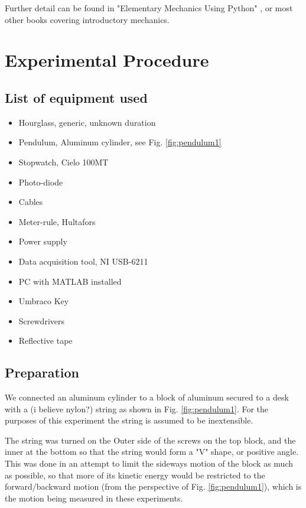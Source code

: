 \documentclass[%
 reprint,
 amsmath,amssymb,
 aps,
]{revtex4-1}
\begin{document}
	Further detail can be found in "Elementary Mechanics Using Python" \cite{elempy}, or most other books covering introductory mechanics.

\section{\label{section:experimentalproced}Experimental Procedure}
    
    \subsection{List of equipment used}
    \begin{itemize}
        \item Hourglass, generic, unknown duration
        \item Pendulum, Aluminum cylinder, see Fig. \ref{fig:pendulum1}
        \item Stopwatch, Cielo 100MT
        \item Photo-diode
        \item Cables
        \item Meter-rule, Hultafors
        \item Power supply
        \item Data acquisition tool, NI USB-6211
        \item PC with MATLAB installed
        \item Umbraco Key
        \item Screwdrivers
        \item Reflective tape
    \end{itemize}

    \subsection{Preparation}
        We connected an aluminum cylinder to a block of aluminum secured to a desk with a (i believe nylon?) string as shown in Fig. \ref{fig:pendulum1}. For the purposes of this experiment the string is assumed to be inextensible. 

        The string was turned on the Outer side of the screws on the top block, and the inner at the bottom so that the string would form a "V" shape, or positive angle. This was done in an attempt to limit the sideways motion of the block as much as possible, so that more of its kinetic energy would be restricted to the forward/backward motion (from the perspective of Fig. \ref{fig:pendulum1}), which is the motion being measured in these experiments.
\end{document}

